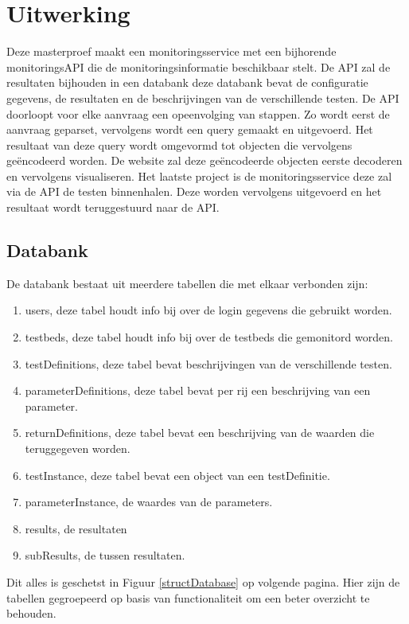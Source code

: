 \chapter{Uitwerking}
{\samenvatting Deze masterproef maakt een monitoringsservice met een bijhorende monitoringsAPI die de monitoringsinformatie beschikbaar stelt. De API zal de resultaten bijhouden in een databank deze databank bevat de configuratie gegevens, de resultaten en de beschrijvingen van de verschillende testen. De API doorloopt voor elke aanvraag een opeenvolging van stappen. Zo wordt eerst de aanvraag geparset, vervolgens wordt een query gemaakt en uitgevoerd. Het resultaat van deze query wordt omgevormd tot objecten die vervolgens ge\"encodeerd worden. De website zal deze ge\"encodeerde objecten eerste decoderen en vervolgens visualiseren. Het laatste project is de monitoringsservice deze zal via de API de testen binnenhalen. Deze worden vervolgens uitgevoerd en het resultaat wordt teruggestuurd naar de API.}
\section{Databank}
\npar
De databank bestaat uit meerdere tabellen die met elkaar verbonden zijn:
\begin{enumerate}
\item users, deze tabel houdt info bij over de login gegevens die gebruikt worden.
\item testbeds, deze tabel houdt info bij over de testbeds die gemonitord worden.
\item testDefinitions, deze tabel bevat beschrijvingen van de verschillende testen.
\item parameterDefinitions, deze tabel bevat per rij een beschrijving van een parameter.
\item returnDefinitions, deze tabel bevat een beschrijving van de waarden die teruggegeven worden. 
\clearpage
\item testInstance, deze tabel bevat een object van een testDefinitie.
\item parameterInstance, de waardes van de parameters.
\item results, de resultaten
\item subResults, de tussen resultaten.
\end{enumerate}
\npar
Dit alles is geschetst in Figuur \ref{structDatabase} op volgende pagina. Hier zijn de tabellen gegroepeerd op basis van functionaliteit om een beter overzicht te behouden.
\clearpage
